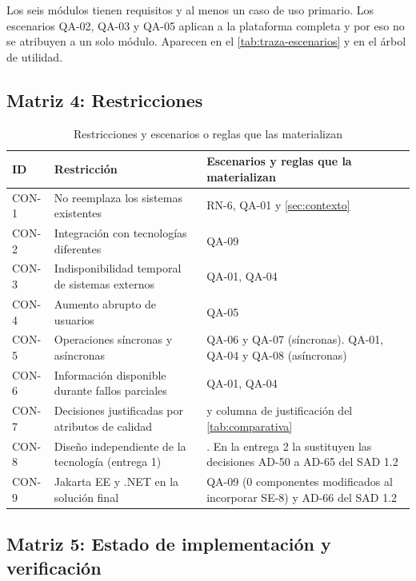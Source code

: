 \documentclass[11pt,letterpaper]{article}
\begin{document}
Los seis módulos tienen requisitos y al menos un caso de uso primario. Los escenarios QA-02, QA-03
y QA-05 aplican a la plataforma completa y por eso no se atribuyen a un solo módulo. Aparecen en el
\cref{tab:traza-escenarios} y en el árbol de utilidad.

\subsection{Matriz 4: Restricciones}

\begin{table}[H]
\centering
\caption{Restricciones y escenarios o reglas que las materializan}\label{tab:traza-restricciones}
\begin{tabular}{L{1.6cm} L{6.4cm} L{7.6cm}}
\toprule
\textbf{ID} & \textbf{Restricción} & \textbf{Escenarios y reglas que la materializan} \\
\midrule
CON-1 & No reemplaza los sistemas existentes & RN-6, QA-01 y \cref{sec:contexto} \\
CON-2 & Integración con tecnologías diferentes & QA-09 \\
CON-3 & Indisponibilidad temporal de sistemas externos & QA-01, QA-04 \\
CON-4 & Aumento abrupto de usuarios & QA-05 \\
CON-5 & Operaciones síncronas y asíncronas & QA-06 y QA-07 (síncronas). QA-01, QA-04 y QA-08
(asíncronas) \\
CON-6 & Información disponible durante fallos parciales & QA-01, QA-04 \\
CON-7 & Decisiones justificadas por atributos de calidad &  y columna de
justificación del \cref{tab:comparativa} \\
CON-8 & Diseño independiente de la tecnología (entrega 1) & . En la entrega 2
la sustituyen las decisiones AD-50 a AD-65 del SAD 1.2 \cite{sad} \\
CON-9 & Jakarta EE y .NET en la solución final & QA-09 (0 componentes modificados al incorporar SE-8)
y AD-66 del SAD 1.2 \cite{sad} \\
\bottomrule
\end{tabular}
\end{table}

\subsection{Matriz 5: Estado de implementación y verificación}
\label{sec:matriz-implementacion}
\end{document}
